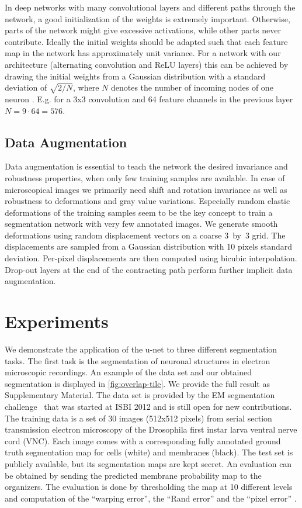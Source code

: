 \documentclass{llncs}
\begin{document}
In deep networks with many convolutional layers and different paths through the network, a good initialization of the weights is extremely important. Otherwise, parts of the network might give excessive activations, while other parts never contribute. Ideally the initial weights should be adapted such that each feature map in the network has approximately unit variance. For a network with our architecture (alternating convolution and ReLU layers) this can be achieved by drawing the initial weights from a Gaussian distribution with a standard deviation of $\sqrt{2/N}$, where $N$ denotes the number of incoming nodes of one neuron \cite{He2015}. E.g. for a 3x3 convolution and 64 feature channels in the previous layer $N = 9\cdot 64 = 576$.


\subsection{Data Augmentation}
Data augmentation is essential to teach the network the desired invariance and robustness properties, when only few training samples are available. In case of microscopical images we primarily need shift and rotation invariance as well as robustness to deformations and gray value variations. Especially random elastic deformations of the training samples seem to be the key concept to train a segmentation network with very few annotated images.
We generate smooth deformations using random displacement vectors on a coarse 3~by~3 grid. The displacements are sampled from a  Gaussian distribution with 10 pixels standard deviation. Per-pixel displacements are then computed using bicubic interpolation. Drop-out layers at the end of the contracting path perform further implicit data augmentation.

\section{Experiments}

We demonstrate the application of the u-net to three different segmentation tasks. The first task is the segmentation of neuronal structures in electron microscopic recordings. An example of the data set and our obtained segmentation is displayed in \autoref{fig:overlap-tile}. We provide the full result as Supplementary Material. The data set is provided by the EM segmentation challenge~\cite{em-segmentation-webpage} that was started at ISBI 2012 and is still open for new contributions. The training data is a set of 30 images (512x512 pixels) from serial section transmission electron microscopy of the Drosophila first instar larva ventral nerve cord (VNC). Each image comes with a corresponding fully annotated ground truth segmentation map for cells (white) and membranes (black). The test set is publicly available, but its segmentation maps are kept secret. An evaluation can be obtained by sending the predicted membrane probability map to the organizers. The evaluation is done by thresholding the map at 10 different levels and computation of the ``warping error'', the ``Rand error'' and the ``pixel error'' \cite{em-segmentation-webpage}.
\end{document}
